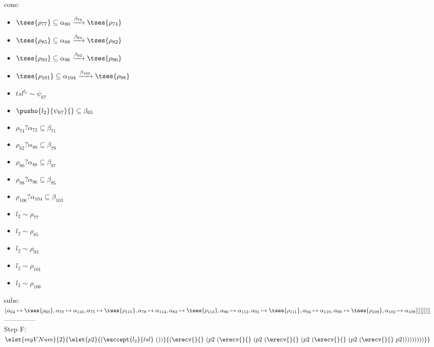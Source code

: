 \documentclass[12pt]{article}
\begin{document}
\\  cons: \begin{itemize}
\item $  \tses{ \rho_{77}} \subseteq \alpha_{80} \xrightarrow{\beta_{76}}  \tses{ \rho_{74}} $
\item $  \tses{ \rho_{85}} \subseteq \alpha_{88} \xrightarrow{\beta_{84}}  \tses{ \rho_{82}} $
\item $  \tses{ \rho_{93}} \subseteq \alpha_{96} \xrightarrow{\beta_{92}}  \tses{ \rho_{90}} $
\item $  \tses{ \rho_{101}} \subseteq \alpha_{104} \xrightarrow{\beta_{100}}  \tses{ \rho_{98}} $
\item $ \overline{{tsl}^{l_{2}}} \sim\psi_{67} $
\item $ \pusho{ l_{2}} {\psi_{67}}{} \subseteq \beta_{65} $
\item $ \rho_{74}?\alpha_{72} \subseteq \beta_{71} $
\item $ \rho_{82}?\alpha_{80} \subseteq \beta_{79} $
\item $ \rho_{90}?\alpha_{88} \subseteq \beta_{87} $
\item $ \rho_{98}?\alpha_{96} \subseteq \beta_{95} $
\item $ \rho_{106}?\alpha_{104} \subseteq \beta_{103} $
\item $ l_{2} \sim\rho_{77} $
\item $ l_{2} \sim\rho_{85} $
\item $ l_{2} \sim\rho_{93} $
\item $ l_{2} \sim\rho_{101} $
\item $ l_{2} \sim\rho_{106} $
\end{itemize} 
  subs:  $ [ \alpha_{64}\mapsto \tses{ \rho_{69}}, \alpha_{70}\mapsto\alpha_{116}, \alpha_{75}\mapsto \tses{ \rho_{115}}, \alpha_{78}\mapsto\alpha_{114}, \alpha_{83}\mapsto \tses{ \rho_{113}}, \alpha_{86}\mapsto\alpha_{112}, \alpha_{91}\mapsto \tses{ \rho_{111}}, \alpha_{94}\mapsto\alpha_{110}, \alpha_{99}\mapsto \tses{ \rho_{109}}, \alpha_{102}\mapsto\alpha_{108}] [] [] [] [] $  
 \\--------------\\ 
Step F: $ \elet{myVNum}{2}{\elet{p2}{(\eaccept{ l_{2} }{tsl}~())}{(\erecv{}{}~(p2~(\erecv{}{}~(p2~(\erecv{}{}~(p2~(\erecv{}{}~(p2~(\erecv{}{}~p2)))))))))}} $
\end{document}
